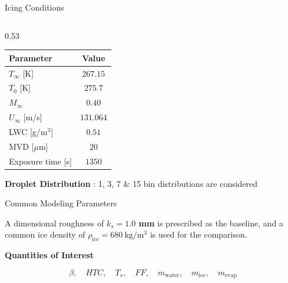 \begin{frame}[shrink]{\small Icing Conditions}
\begin{columns}[T,onlytextwidth]
\begin{column}{0.53\textwidth}
\begin{tabular}{lc}
\toprule
\textbf{Parameter} & \textbf{Value} \\
\midrule
$T_\infty$ [K]          & $267.15$ \\
$T_0$ [K]               & $275.7$ \\
$M_\infty$              & $0.40$ \\
$U_\infty$ [m/s]        & $131.064$ \\
LWC [g/m$^3$]           & $0.51$ \\
MVD [$\mu$m]            & $20$ \\
Exposure time [s]       & $1350$ \\
\bottomrule
\end{tabular}

\vspace{0.30cm}

\textbf{Droplet Distribution} : 1, 3, 7 $\&$ 15 bin distributions are considered

\vspace{0.25cm}

\begin{block}{\scriptsize Common Modeling Parameters}

A dimensional roughness of \textbf{$k_s=1.0$ mm} is prescribed as the baseline, and a common ice density of \textbf{$\rho_{\mathrm{ice}}=680~\mathrm{kg/m^3}$} is used for the comparison.

\end{block}

\vspace{0.35cm}

\textbf{Quantities of Interest}

\vspace{-0.35cm}

\[
\beta,\quad HTC,\quad T_s,\quad FF,\quad
m_{\mathrm{water}},\quad m_{\mathrm{ice}},\quad
m_{\mathrm{evap}}
\]

\end{column}

\end{columns}

\end{frame}


